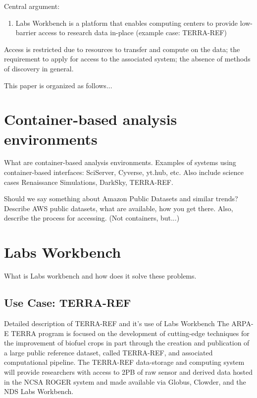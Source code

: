 \documentclass{sig-alternate}
\begin{document}
Central argument:
\begin{enumerate}
\item Labs Workbench is a platform that enables computing centers to provide low-barrier access to research data in-place (example case: TERRA-REF)
\end{enumerate}


Access is restricted due to resources to transfer and compute on the data; the requirement to apply for access to the associated system; the absence of methods of discovery in general.



This paper is organized as follows...

\section{Container-based analysis environments}

What are container-based analysis environments. Examples of systems using container-based interfaces: SciServer, Cyverse, yt.hub, etc. Also include science cases Renaissance Simulations, DarkSky, TERRA-REF.

Should we say something about Amazon Public Datasets and similar trends? Describe AWS public datasets, what are available, how you get there. Also, describe the process for accessing. (Not containers, but...)

\section{Labs Workbench}

What is Labs workbench and how does it solve these problems.

\subsection{Use Case: TERRA-REF}

Detailed description of TERRA-REF and it's use of Labs Workbench
The ARPA-E TERRA program is focused on the development of cutting-edge techniques for the improvement of biofuel crops in part through the creation and publication of a large public reference dataset, called TERRA-REF, and associated computational pipeline. The TERRA-REF data-storage and computing system will provide researchers with access to 2PB of raw sensor and derived data hosted in the NCSA ROGER system and made available via Globus, Clowder, and the NDS Labs Workbench.  
\end{document}
